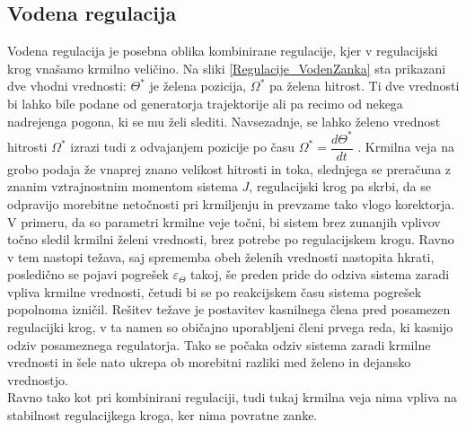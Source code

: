\documentclass[a4paper,twoside,openright,12pt]{book}
\begin{document}
\subsection{Vodena regulacija}
Vodena regulacija je posebna oblika kombinirane regulacije, kjer v regulacijski krog vnašamo krmilno veličino. Na sliki \ref{Regulacije_VodenZanka} sta prikazani dve vhodni vrednosti: $\Theta^*$ je želena pozicija, $\Omega^*$ pa želena hitrost. Ti dve vrednosti bi lahko bile podane od generatorja trajektorije ali pa recimo od nekega nadrejenga pogona, ki se mu želi slediti. Navsezadnje, se lahko želeno vrednost hitrosti $\Omega^*$ izrazi tudi z odvajanjem pozicije po času $\Omega^*=\dfrac{d\Theta^*}{dt}$ . Krmilna veja na grobo podaja že vnaprej znano velikost hitrosti in toka, slednjega se preračuna z znanim vztrajnostnim momentom sistema $J$, regulacijski krog pa skrbi, da se odpravijo morebitne netočnosti pri krmiljenju in prevzame tako vlogo korektorja. V primeru, da so parametri krmilne veje točni, bi sistem brez zunanjih vplivov točno sledil krmilni želeni vrednosti, brez potrebe po regulacijskem krogu. Ravno v tem nastopi težava, saj sprememba obeh želenih vrednosti nastopita hkrati, posledično se pojavi pogrešek $\varepsilon_{\Theta}$ takoj, še preden pride do odziva sistema zaradi vpliva krmilne vrednosti, četudi bi se po reakcijskem času sistema pogrešek popolnoma izničil. Rešitev težave je postavitev kasnilnega člena pred posamezen regulacijki krog, v ta namen so običajno uporabljeni členi prvega reda, ki kasnijo odziv posameznega regulatorja. Tako se počaka odziv sistema zaradi krmilne vrednosti in šele nato ukrepa ob morebitni razliki med želeno in dejansko vrednostjo.\\
Ravno tako kot pri kombinirani regulaciji, tudi tukaj krmilna veja nima vpliva na stabilnost regulacijkega kroga, ker nima povratne zanke. 
\end{document}
